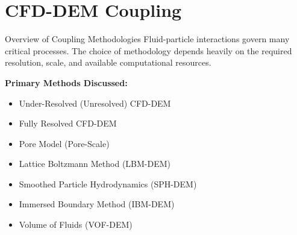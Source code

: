 \chapter{CFD-DEM Coupling}


\begin{frame}{Overview of Coupling Methodologies}
    Fluid-particle interactions govern many critical processes. The choice of methodology depends heavily on the required resolution, scale, and available computational resources.
    \vspace{0.5cm}
    
    \textbf{Primary Methods Discussed:}
    \begin{itemize}
        \item Under-Resolved (Unresolved) CFD-DEM
        \item Fully Resolved CFD-DEM
        \item Pore Model (Pore-Scale)
        \item Lattice Boltzmann Method (LBM-DEM)
        \item Smoothed Particle Hydrodynamics (SPH-DEM)
        \item Immersed Boundary Method (IBM-DEM)
        \item Volume of Fluids (VOF-DEM)
    \end{itemize}
\end{frame}

